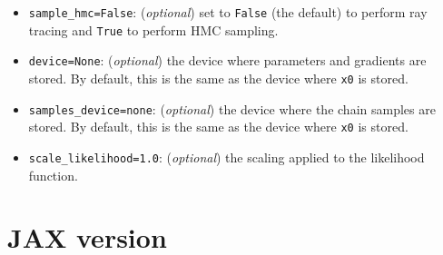 \documentclass[12pt]{article}
\begin{document}
\begin{itemize}
\item \lstinline{sample_hmc=False}: (\textit{optional}) set to \lstinline{False} (the default) to perform ray tracing and \lstinline{True} to perform HMC sampling.  
\item \lstinline{device=None}: (\textit{optional}) the device where parameters and gradients are stored.  By default, this is the same as the device where \lstinline{x0} is stored.
\item \lstinline{samples_device=none}:   (\textit{optional}) the device where the chain samples are stored.  By default, this is the same as the device where \lstinline{x0} is stored.
\item \lstinline{scale_likelihood=1.0}:   (\textit{optional}) the scaling applied to the likelihood function.
\end{itemize}



\section{JAX version}
\label{s:jax}
\end{document}
